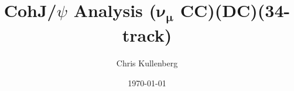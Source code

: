 \title{CohJ/$\psi$ Analysis ($\boldsymbol{\nu_\mu}$ \textbf{CC})(\textbf{DC})(\textbf{34-track})}
\author{Chris Kullenberg}
\date{\today}
